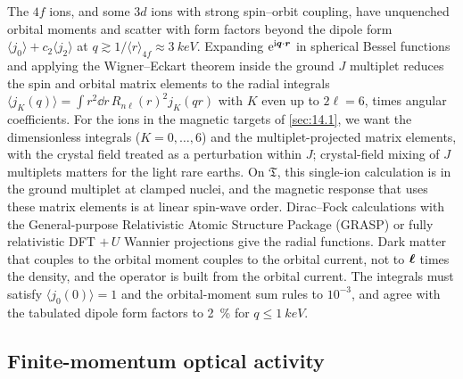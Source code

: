 The $4f$ ions, and some $3d$ ions with strong spin--orbit coupling, have unquenched orbital moments and scatter with form factors beyond the dipole form $\langle j_0\rangle + c_2\langle j_2\rangle$ at $q \gtrsim 1/\langle r\rangle_{4f} \approx \SI{3}{keV}$. Expanding $\mathrm{e}^{\mathrm{i}\bm{q}\cdot\bm{r}}$ in spherical Bessel functions and applying the Wigner--Eckart theorem inside the ground $J$ multiplet reduces the spin and orbital matrix elements to the radial integrals $\langle j_K(q)\rangle = \int r^2\dd r\,R_{n\ell}(r)^2j_K(qr)$ with $K$ even up to $2\ell = 6$, times angular coefficients. For the ions in the magnetic targets of \cref{sec:14.1}, we want the dimensionless integrals ($K = 0,\dots,6$) and the multiplet-projected matrix elements, with the crystal field treated as a perturbation within $J$; crystal-field mixing of $J$ multiplets matters for the light rare earths. On $\mathfrak{T}$, this single-ion calculation is in the ground multiplet at clamped nuclei, and the magnetic response that uses these matrix elements is at linear spin-wave order. Dirac--Fock calculations with the General-purpose Relativistic Atomic Structure Package (GRASP) or fully relativistic DFT $+\,U$ Wannier projections give the radial functions. Dark matter that couples to the orbital moment couples to the orbital current, not to $\bm{\ell}$ times the density, and the operator is built from the orbital current. The integrals must satisfy $\langle j_0(0)\rangle = 1$ and the orbital-moment sum rules to $10^{-3}$, and agree with the tabulated dipole form factors to \SI{2}{\percent} for $q \le \SI{1}{keV}$.

\subsection{Finite-momentum optical activity}

